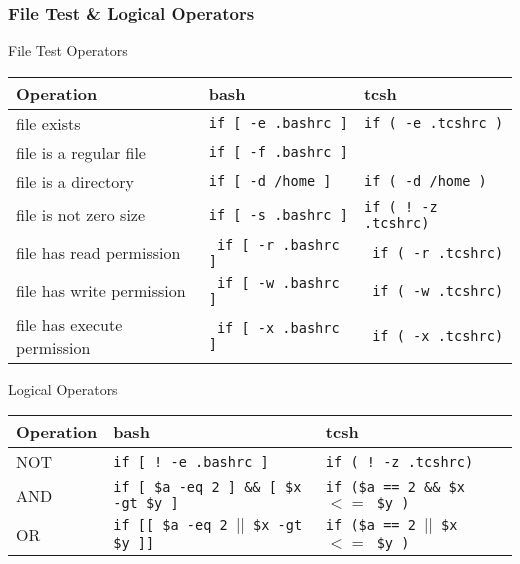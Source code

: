 \documentclass[10pt,t]{beamer}
\begin{document}
\begin{frame}
  \frametitle{File Test \& Logical Operators}
  \begin{exampleblock}{File Test Operators}
    \begin{tabular}{lll}
      Operation & \textbf{bash} & \textbf{tcsh} \\
      \hline
      file exists & \texttt{if [ -e .bashrc ]} & \texttt{if ( -e .tcshrc )}\\
      file is a regular file & \texttt{if [ -f .bashrc ]} &  \\
      file is a directory & \texttt{if [ -d /home ]} & \texttt{if ( -d /home )} \\
      file is not zero size & \texttt{if [ -s .bashrc ]} & \texttt{if ( ! -z .tcshrc)} \\
      file has read permission & \texttt{ if [ -r .bashrc ]} & \texttt{ if ( -r .tcshrc)} \\
      file has write permission & \texttt{ if [ -w .bashrc ]} & \texttt{ if ( -w .tcshrc)} \\
      file has execute permission & \texttt{ if [ -x .bashrc ]} & \texttt{ if ( -x .tcshrc)} \\
      \hline
    \end{tabular}
  \end{exampleblock}
  \begin{exampleblock}{Logical Operators}
    \begin{tabular}{lll}
      Operation & \textbf{bash} & \textbf{tcsh} \\
      \hline
      NOT & \texttt{if [ ! -e .bashrc ]} & \texttt{if ( ! -z .tcshrc)} \\
      AND & \texttt{if [ \$a -eq 2 ] \&\& [ \$x -gt \$y ]} & \texttt{if (\$a == 2 \&\& \$x $<=$ \$y )} \\ 
      OR &  \texttt{if [[ \$a -eq 2 $||$  \$x -gt \$y ]]} & \texttt{if (\$a == 2 $||$ \$x $<=$ \$y )} \\
      \hline
    \end{tabular}
  \end{exampleblock}
\end{frame}
\end{document}
